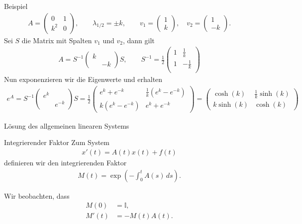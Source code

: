 \documentclass[notheorems,hidelinks,aspectratio=1610]{beamer}
\begin{document}
\begin{frame}{Beispiel}
  \begin{gather*}
    A =
    \begin{pmatrix}
      0 & 1\\k^2 & 0
    \end{pmatrix},
    \qquad \lambda_{1/2} = \pm k,
    \qquad v_1 =
    \begin{pmatrix}
      1\\k
    \end{pmatrix},
    \quad
    v_2 =
    \begin{pmatrix}
      1 \\ -k
    \end{pmatrix}.
  \end{gather*}
  \pause
  Sei $S$ die Matrix mit Spalten $v_1$ und $v_2$, dann gilt
  \begin{gather*}
    A = S^{-1}
    \begin{pmatrix}
      k \\ &-k
    \end{pmatrix}
    S,
    \qquad
    S^{-1} =
    \frac12
    \begin{pmatrix}
      1 & \tfrac1k\\
      1 & -\tfrac1k\\
    \end{pmatrix}
  \end{gather*}
  \pause
  Nun exponenzieren wir die Eigenwerte und erhalten
  \begin{gather*}
    e^A =  S^{-1}
    \begin{pmatrix}
      e^k \\ &e^{-k}
    \end{pmatrix}
    S
    = \frac12
    \begin{pmatrix}
      e^k + e^{-k} & \tfrac 1k (e^k - e^{-k}) \\
      k (e^k - e^{-k}) & e^k + e^{-k}
    \end{pmatrix}
    =
    \begin{pmatrix}
      \cosh(k) & \tfrac 1k \sinh(k) \\
      k \sinh(k) & \cosh(k)
    \end{pmatrix}
  \end{gather*}
  \vspace*{.9\textheight}
\end{frame}

\begin{frame}{Lösung des allgemeinen linearen Systems}
  \begin{block}{Integrierender Faktor}
    Zum System
    \begin{gather*}
      x'(t) = A(t) x(t) + f(t)
    \end{gather*}
    definieren wir den integrierenden Faktor
    \begin{gather*}
      M(t) = \exp\left(-\int_0^t A(s) \,ds\right).
    \end{gather*}
  \end{block}
  Wir beobachten, dass
  \begin{align*}
    M(0) &= \mathbb I,\\
    M'(t) &= -M(t) A(t).
  \end{align*}
\end{frame}
\end{document}
